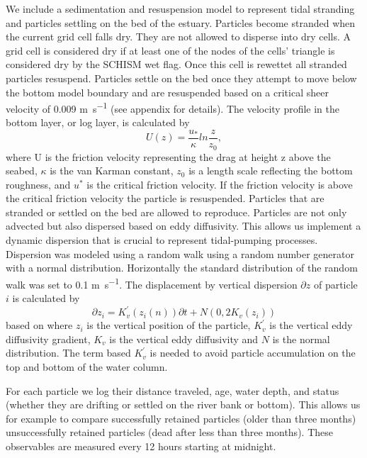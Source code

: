 \documentclass[npg, manuscript]{copernicus}
\begin{document}
We include a sedimentation and resuspension model to represent tidal stranding and particles settling on the bed of the estuary.
Particles become stranded when the current grid cell falls dry. 
They are not allowed to disperse into dry cells.
A grid cell is considered dry if at least one of the nodes of the cells' triangle is considered dry by the SCHISM wet flag.
Once this cell is rewettet all stranded particles resuspend.
Particles settle on the bed once they attempt to move below the bottom model boundary and are resuspended based on a critical sheer velocity of 0.009 \unit{m s^{-1}} (see appendix for details).
The velocity profile in the bottom layer, or log layer, is calculated by
\begin{equation}
    U(z) = \frac{u_{*}}{\kappa} ln \frac{z}{z_{0}},
\end{equation}
where U is the friction velocity representing the drag at height z  above the seabed, $\kappa$ is the van Karman constant, $z_{0}$ is a length
scale reflecting the bottom roughness, and $u^{*}$ is the critical friction velocity.
If the friction velocity is above the critical friction velocity the particle is resuspended.
Particles that are stranded or settled on the bed are allowed to reproduce.
Particles are not only advected but also dispersed based on eddy diffusivity.
This allows us implement a dynamic dispersion that is crucial to represent tidal-pumping processes.
Dispersion was modeled using a random walk using a random number generator with a normal distribution.
Horizontally the standard distribution of the random walk was set to 0.1 \unit{m s^{-1}}.
The displacement by vertical dispersion $\partial z$ of particle $i$ is calculated by
\begin{equation}
    \partial z_{i} = K_{v}^{'}(z_{i}(n))\partial t + N(0, 2K_{v}(z_{i}))
\end{equation}
based on \citep{Yamazaki2014} where $z_{i}$ is the vertical position of the particle, $K_{v}^{'}$ is the vertical eddy diffusivity gradient, $K_{v}$ is the vertical eddy diffusivity and $N$ is the normal distribution.
The term based $K_{v}^{'}$ is needed to avoid particle accumulation on the top and bottom of the water column.

For each particle we log their distance traveled, age, water depth, and status (whether they are drifting or settled on the river bank or bottom). This allows us for example to compare successfully retained particles (older than three months) unsuccessfully retained particles (dead after less than three months).
These observables are measured every 12 hours starting at midnight.
\end{document}

